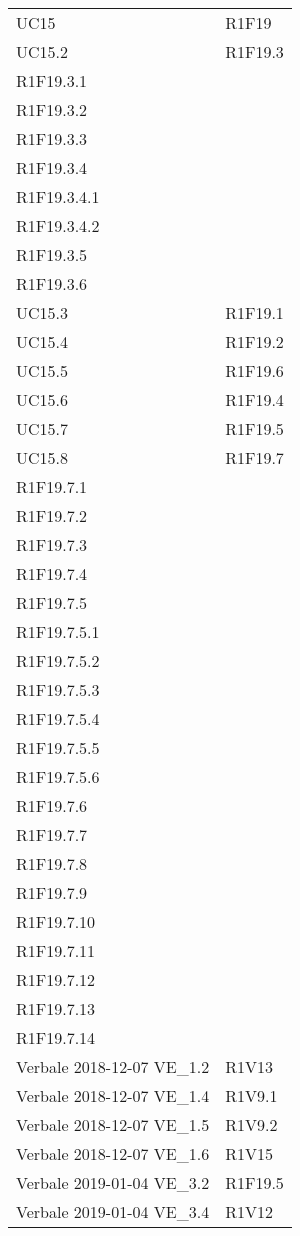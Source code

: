 \begin{longtable}{ >{\centering}p{}
			>{\centering}p{}}
	UC15	&	R1F19	\tabularnewline
	UC15.2	&	R1F19.3\\
	R1F19.3.1\\
	R1F19.3.2\\
	R1F19.3.3\\
	R1F19.3.4\\
	R1F19.3.4.1\\
	R1F19.3.4.2\\
	R1F19.3.5\\
	R1F19.3.6	\tabularnewline
	UC15.3	&	R1F19.1	\tabularnewline
	UC15.4	&	R1F19.2	\tabularnewline
	UC15.5	&	R1F19.6	\tabularnewline
	UC15.6	&	R1F19.4	\tabularnewline
	UC15.7	&	R1F19.5	\tabularnewline
	UC15.8	&	R1F19.7\\ 
	R1F19.7.1\\ 
	R1F19.7.2\\ 
	R1F19.7.3\\ 
	R1F19.7.4\\ 
	R1F19.7.5\\ 
	R1F19.7.5.1\\ 
	R1F19.7.5.2\\ 
	R1F19.7.5.3\\ 
	R1F19.7.5.4\\ 
	R1F19.7.5.5\\ 
	R1F19.7.5.6\\ 
	R1F19.7.6\\ 
	R1F19.7.7\\ 
	R1F19.7.8\\ 
	R1F19.7.9\\ 
	R1F19.7.10\\ 
	R1F19.7.11\\ 
	R1F19.7.12\\ 
	R1F19.7.13\\ 
	R1F19.7.14	\tabularnewline
	Verbale 2018-12-07 VE\_1.2	&	R1V13	\tabularnewline
	Verbale 2018-12-07 VE\_1.4	&	R1V9.1	\tabularnewline
	Verbale 2018-12-07 VE\_1.5	&	R1V9.2	\tabularnewline
	Verbale 2018-12-07 VE\_1.6	&	R1V15	\tabularnewline
	Verbale 2019-01-04 VE\_3.2	&	R1F19.5	\tabularnewline
	Verbale 2019-01-04 VE\_3.4	&	R1V12	\tabularnewline
	
	
	\end{longtable}
